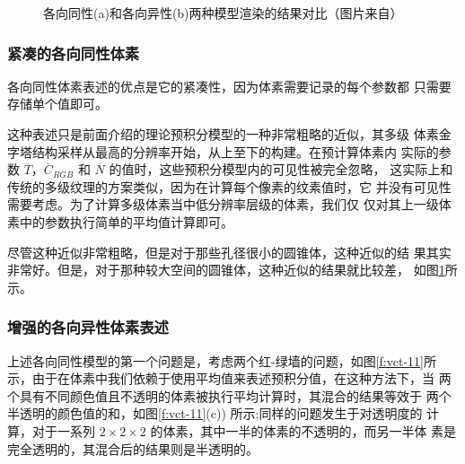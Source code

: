 \begin{figure}
\begin{subfigure}[b]{0.5\textwidth}
		\caption{}
	\end{subfigure}
	\caption{各向同性(a)和各向异性(b)两种模型渲染的结果对比（图片来自\cite{a:InteractiveIndirectIlluminationUsingVoxelConeTracing}）}
	\label{f:vct-12}
\end{figure}


\subsubsection{紧凑的各向同性体素}
各向同性体素表述的优点是它的紧凑性，因为体素需要记录的每个参数都 只需要存储单个值即可。

这种表述只是前面介绍的理论预积分模型的一种非常粗略的近似，其多级 体素金字塔结构采样从最高的分辨率开始，从上至下的构建。在预计算体素内 实际的参数 $\overline{T}$，$\overline{C}_{RGB}$ 和 $\overline{N}$ 的值时，这些预积分模型内的可见性被完全忽略， 这实际上和传统的多级纹理的方案类似，因为在计算每个像素的纹素值时，它 并没有可见性需要考虑。为了计算多级体素当中低分辨率层级的体素，我们仅 仅对其上一级体素中的参数执行简单的平均值计算即可。

尽管这种近似非常粗略，但是对于那些孔径很小的圆锥体，这种近似的结 果其实非常好。但是，对于那种较大空间的圆锥体，这种近似的结果就比较差， 如图\ref{f:vct-12}所示。




\subsubsection{增强的各向异性体素表述}
上述各向同性模型的第一个问题是，考虑两个红-绿墙的问题，如图\ref{f:vct-11}所 示，由于在体素中我们依赖于使用平均值来表述预积分值，在这种方法下，当 两个具有不同颜色值且不透明的体素被执行平均计算时，其混合的结果等效于 两个半透明的颜色值的和，如图\ref{f:vct-11}(c)) 所示;同样的问题发生于对透明度的 计算，对于一系列 $2\times 2\times 2$ 的体素，其中一半的体素的不透明的，而另一半体 素是完全透明的，其混合后的结果则是半透明的。


